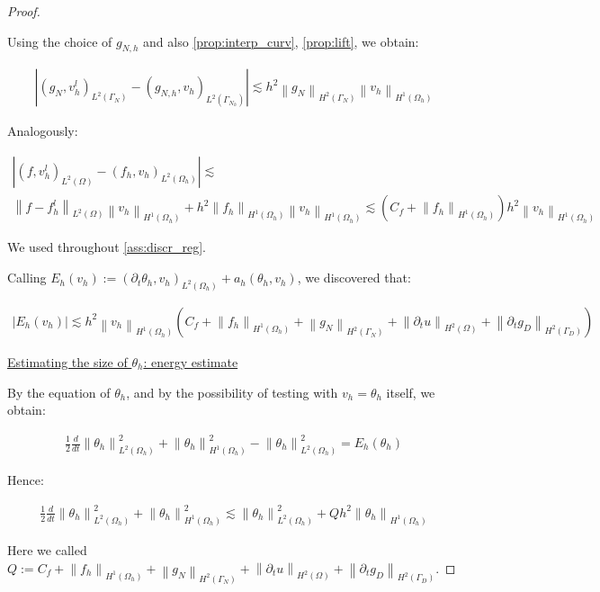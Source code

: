 \documentclass[english,a4paper,9pt,oneside]{scrbook}	%
\theoremstyle{break}
\newenvironment{mproof}[1][\proofname]{%
  \begin{proof}[#1]$ $\par\nobreak\ignorespaces
}{%
  \end{proof}
}
\renewcommand*{\proofname}{Proof}
\theoremstyle{remark}
\newcommand{\norm}[1]{\left\lVert#1\right\rVert}
\begin{document}
\begin{appendices}
\begin{mproof}
Using the choice of $g_{N,h}$ and also \cref{prop:interp_curv}, \cref{prop:lift}, we obtain:

\begin{align*}
	|(g_{N}, v_h^l)_{L^2(\Gamma_{N})} - (g_{N,h}, v_h)_{L^2(\Gamma_{N_h})} |\lesssim 	h^2 \norm{g_N}_{H^2(\Gamma_N)}\norm{v_h}_{H^1(\Omega_h)}
\end{align*}

Analogously:

\begin{align*}
	|(f, v_h^l)_{L^2(\Omega)} - (f_h, v_h)_{L^2(\Omega_h)}|\lesssim\\
	\norm{f-f_h^l}_{L^2(\Omega)}\norm{v_h}_{H^1(\Omega_h)} + h^2 \norm{f_h}_{H^1(\Omega_h)}\norm{v_h}_{H^1(\Omega_h)}\lesssim (C_f + \norm{f_h}_{H^1(\Omega_h)}) h^2 \norm{v_h}_{H^1(\Omega_h)}
\end{align*}

We used throughout \cref{ass:discr_reg}.

Calling $E_h(v_h):=(\partial_t \theta_h , v_h)_{L^2(\Omega_h)} + a_h(\theta_h, v_h)$, we discovered that:

\begin{align}
\label{eqn:theta_residual}
	|E_h(v_h)|\lesssim h^2 \norm{v_h}_{H^1(\Omega_h)} (C_f + \norm{f_h}_{H^1(\Omega_h)} + \norm{g_N}_{H^2(\Gamma_N)} + \norm{\partial_t u}_{H^2(\Omega)} + \norm{\partial_t g_D}_{H^2(\Gamma_D)} )
\end{align}

\underline{Estimating the size of $\theta_h$: energy estimate}

By the equation of $\theta_h$, and by the possibility of testing with $v_h = \theta_h$ itself, we obtain:

\begin{align*}
	\frac{1}{2} \frac{d}{dt} \norm{\theta_h}_{L^2(\Omega_h)}^2 + \norm{\theta_h}^2_{H^1(\Omega_h)} - \norm{\theta_h}^2_{L^2(\Omega_h)} = E_h(\theta_h)
\end{align*}

Hence:

\begin{align*}
	\frac{1}{2} \frac{d}{dt} \norm{\theta_h}_{L^2(\Omega_h)}^2 + \norm{\theta_h}^2_{H^1(\Omega_h)} \lesssim \norm{\theta_h}^2_{L^2(\Omega_h)}  + Qh^2\norm{\theta_h}_{H^1(\Omega_h)}
\end{align*}

Here we called $Q:=C_f + \norm{f_h}_{H^1(\Omega_h)} + \norm{g_N}_{H^2(\Gamma_N)} + \norm{\partial_t u}_{H^2(\Omega)} + \norm{\partial_t g_D}_{H^2(\Gamma_D)}$.


\end{mproof}
\end{appendices}
\end{document}
